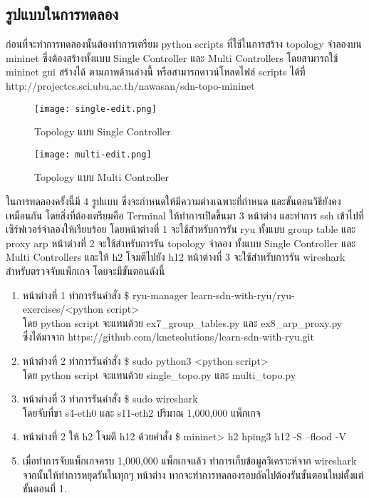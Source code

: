\subsection{รูปแบบในการทดลอง}
\indent\indent
ก่อนที่จะทำการทดลองนั้นต้องทำการเตรียม python scripts ที่ใช้ในการสร้าง topology จำลองบน mininet
ซึ่งต้องสร้างทั้งแบบ Single Controller และ Multi Controllers โดยสามารถใช้ mininet gui สร้างได้ ตามภาพด้านล่างนี้
หรือสามารถดาวน์โหลดไฟล์ scripts ได้ที่ http://projectcs.sci.ubu.ac.th/nawasan/sdn-topo-mininet
\\
\begin{figure}[h!]
    \centering
    \texttt{[image: single-edit.png]}
    \caption{Topology แบบ Single Controller}
    \label{img:topo_cs}
\end{figure}

\begin{figure}[h!]
    \centering
    \texttt{[image: multi-edit.png]}
    \caption{Topology แบบ Multi Controller}
    \label{img:topo_cm}
\end{figure}

ในการทดลองครั้งนี้มี 4 รูปแบบ ซึ่งจะกำหนดให้มีความต่างเฉพาะที่กำหนด และขั้นตอนวิธียังคงเหมือนกัน
โดยสิ่งที่ต้องเตรียมคือ Terminal ให้ทำการเปิดขึ้นมา 3 หน้าต่าง และทำการ ssh เข้าไปที่เซิร์ฟเวอร์จำลองให้เรียบร้อย 
โดยหน้าต่างที่ 1 จะใช้สำหรับการรัน \gls{ryu} ทั้งแบบ group table และ proxy arp 
หน้าต่างที่ 2 จะใช้สำหรับการรัน topology จำลอง ทั้งแบบ Single Controller และ Multi Controllers 
และให้ h2 โจมตีไปยัง h12
หน้าต่างที่ 3 จะใช้สำหรับการรัน wireshark สำหรับตรวจจับแพ็กเกจ
โดยจะมีขั้นตอนดังนี้

\begin{enumerate}
    \item หน้าต่างที่ 1 ทำการรันคำสั่ง
    \$ ryu-manager learn-sdn-with-ryu/ryu-exercises/<python script> \\โดย python script จะแทนด้วย ex7\_group\_tables.py และ ex8\_arp\_proxy.py 
    \\ซึ่งได้มาจาก https://github.com/knetsolutions/learn-sdn-with-ryu.git
    \item หน้าต่างที่ 2 ทำการรันคำสั่ง
    \$ sudo python3 <python script> \\
    โดย python script จะแทนด้วย single\_topo.py และ multi\_topo.py 
    \item หน้าต่างที่ 3 ทำการรันคำสั่ง
    \$ sudo wireshark \\
    โดยจับที่ขา s4-eth0 และ s11-eth2 ปริมาณ 1,000,000 แพ็กเกจ
    \item หน้าต่างที่ 2 ให้ h2 โจมตี h12 ด้วยคำสั่ง \$ mininet> h2 hping3 h12 -S --flood -V
    \item เมื่อทำการจับแพ็กเกจครบ 1,000,000 แพ็กเกจแล้ว ทำการเก็บข้อมูลวิเคราะห์จาก wireshark จากนั้นให้ทำการหยุดรันในทุกๆ หน้าต่าง หากจะทำการทดลองรอบถัดไปต้องรันขั้นตอนใหม่ตั้งแต่ขั้นตอนที่ 1.
\end{enumerate}


